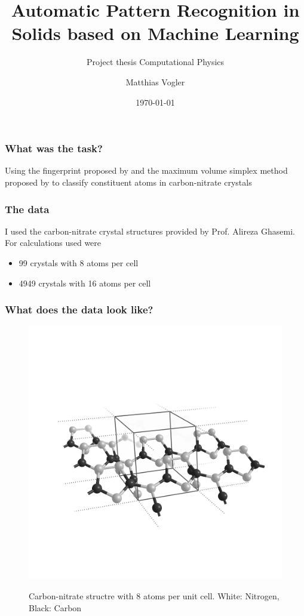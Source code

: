 \documentclass{beamer}
\title{Automatic Pattern Recognition in Solids
based on Machine Learning}
\subtitle{Project thesis Computational Physics}
\date{\today}
\author{Matthias Vogler}
\institute{Departement of Physics\\ University of Basel}
\begin{document}
  \maketitle
\begin{frame}
  \frametitle{What was the task?}
  Using the fingerprint proposed by \citeauthor{Zhu2016} \cite{Zhu2016} and the maximum volume simplex method proposed by \citeauthor{Behnam2020} \cite{Behnam2020} to classify constituent atoms in carbon-nitrate crystals
\end{frame}

\begin{frame}
  \frametitle{The data}
  I used the carbon-nitrate crystal structures provided by Prof. Alireza Ghasemi. For calculations used were
  \begin{itemize}
    \item 99 crystals with 8 atoms per cell
    \item 4949 crystals with 16 atoms per cell

  \end{itemize}

\end{frame}

\begin{frame}
\frametitle{What does the data look like?}
  \begin{figure}[h!]
    \center
    \includegraphics[scale=0.19]{Figures/8structure.png}
    \label{fig:8struct}
    \caption{Carbon-nitrate structre with 8 atoms per unit cell. White: Nitrogen, Black: Carbon}
  \end{figure}
\end{frame}
\end{document}
